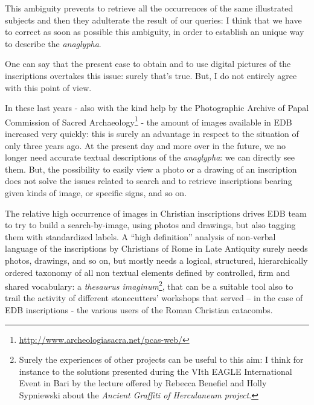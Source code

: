 \documentclass[amsthm,ebook]{saparticle}
\begin{document}
%



This ambiguity prevents to retrieve all the occurrences of the same illustrated subjects and then they adulterate the
result of our queries: I think that we have to correct as soon as possible this ambiguity, in order to establish an
unique way to describe the \emph{anaglypha}. 

One can say that the present ease to obtain and to use digital pictures of the inscriptions overtakes this issue: surely
that's true. But, I do not entirely agree with this point of view. 

In these last years - also with the kind help by the Photographic Archive of Papal Commission of Sacred Archaeology\footnote{\url{http://www.archeologiasacra.net/pcas-web/}}
 - the amount of images available in EDB increased very quickly: this is
surely an advantage in respect to the situation of only three years ago. At the present day and more over in the
future, we no longer need accurate textual descriptions of the \emph{anaglypha}: we can directly see them. But, the
possibility to easily view a photo or a drawing of an inscription does not solve the issues related to search and to
retrieve inscriptions bearing given kinds of image, or specific signs, and so on. 

The relative high occurrence of images in Christian inscriptions drives EDB team to try to build a search-by-image,
using photos and drawings, but also tagging them with standardized labels. A “high definition” analysis of non-verbal
language of the inscriptions by Christians of Rome in Late Antiquity surely needs photos, drawings, and so on, but
mostly needs a logical, structured, hierarchically ordered taxonomy of all non textual elements defined by controlled,
firm and shared vocabulary: a \emph{thesaurus imaginum}\footnote{ Surely the experiences of other projects can be useful to
this aim: I think for instance to the solutions presented during the VIth EAGLE International Event in Bari by the
lecture offered by Rebecca Benefiel and Holly Sypniewski about the \emph{Ancient Graffiti of Herculaneum project}.}, that can
be a suitable tool also to trail the activity of different stonecutters’ workshops that served – in the case of EDB
inscriptions - the various users of the Roman Christian catacombs. 
\end{document}
